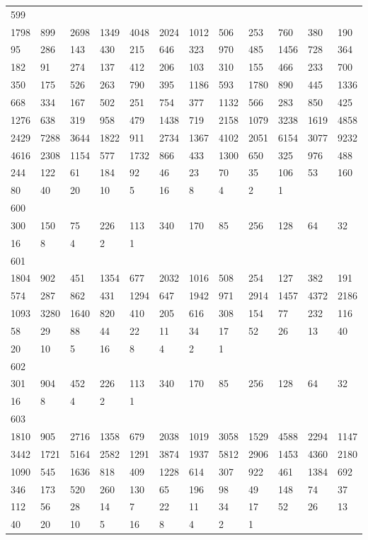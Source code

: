 \begin{longtable}{llllllllllll}
599&&&&&&&&&&&\\
1798& 899& 2698& 1349& 4048& 2024& 1012& 506& 253& 760& 380& 190\\
95& 286& 143& 430& 215& 646& 323& 970& 485& 1456& 728& 364\\
182& 91& 274& 137& 412& 206& 103& 310& 155& 466& 233& 700\\
350& 175& 526& 263& 790& 395& 1186& 593& 1780& 890& 445& 1336\\
668& 334& 167& 502& 251& 754& 377& 1132& 566& 283& 850& 425\\
1276& 638& 319& 958& 479& 1438& 719& 2158& 1079& 3238& 1619& 4858\\
2429& 7288& 3644& 1822& 911& 2734& 1367& 4102& 2051& 6154& 3077& 9232\\
4616& 2308& 1154& 577& 1732& 866& 433& 1300& 650& 325& 976& 488\\
244& 122& 61& 184& 92& 46& 23& 70& 35& 106& 53& 160\\
80& 40& 20& 10& 5& 16& 8& 4& 2& 1& \\

600&&&&&&&&&&&\\
300& 150& 75& 226& 113& 340& 170& 85& 256& 128& 64& 32\\
16& 8& 4& 2& 1& \\

601&&&&&&&&&&&\\
1804& 902& 451& 1354& 677& 2032& 1016& 508& 254& 127& 382& 191\\
574& 287& 862& 431& 1294& 647& 1942& 971& 2914& 1457& 4372& 2186\\
1093& 3280& 1640& 820& 410& 205& 616& 308& 154& 77& 232& 116\\
58& 29& 88& 44& 22& 11& 34& 17& 52& 26& 13& 40\\
20& 10& 5& 16& 8& 4& 2& 1& \\

602&&&&&&&&&&&\\
301& 904& 452& 226& 113& 340& 170& 85& 256& 128& 64& 32\\
16& 8& 4& 2& 1& \\

603&&&&&&&&&&&\\
1810& 905& 2716& 1358& 679& 2038& 1019& 3058& 1529& 4588& 2294& 1147\\
3442& 1721& 5164& 2582& 1291& 3874& 1937& 5812& 2906& 1453& 4360& 2180\\
1090& 545& 1636& 818& 409& 1228& 614& 307& 922& 461& 1384& 692\\
346& 173& 520& 260& 130& 65& 196& 98& 49& 148& 74& 37\\
112& 56& 28& 14& 7& 22& 11& 34& 17& 52& 26& 13\\
40& 20& 10& 5& 16& 8& 4& 2& 1& \\


\end{longtable}
